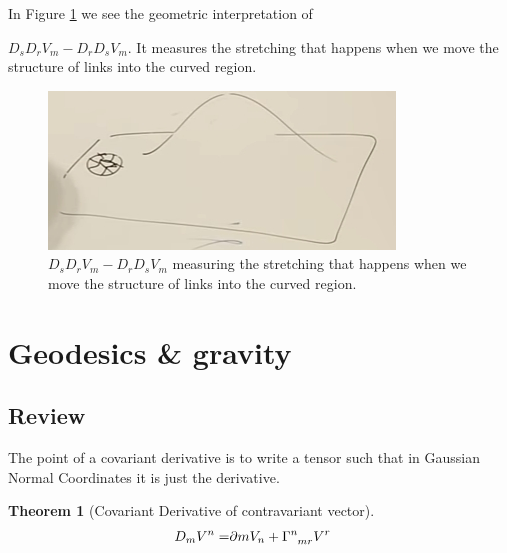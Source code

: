 \documentclass[]{article}
\newtheorem{thm}{Theorem}
\begin{document}
In Figure \ref{fig:gr-3-move-links} we see the geometric interpretation of {$D_s D_r V_m - D_r D_s V_m$. It measures the stretching that happens when we move the structure of links into the curved region.

\begin{figure}[H]
	\caption[Geometric meaning of $D_s D_r V_m - D_r D_s V_m$]{$D_s D_r V_m - D_r D_s V_m$ measuring the stretching that happens when we move the structure of links into the curved region.}\label{fig:gr-3-move-links}
	\includegraphics{gr-3-move-links}
\end{figure}


\section{Geodesics \& gravity}

\subsection{Review}

The point of a covariant derivative is to write a tensor such that in Gaussian Normal Coordinates it is just the derivative.

\begin{thm}[Covariant Derivative of contravariant vector]
	\begin{align*}
		D_m V^n =& \partial m V_n + \Gamma\indices{^n_{mr}} V^r
	\end{align*}
\end{thm}

}
\end{document}

